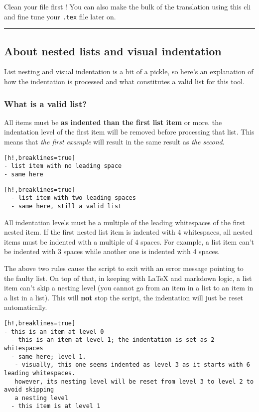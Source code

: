Clean your file first ! You can also make the bulk of the translation using this cli and fine tune your \texttt{.tex} 
file later on.

\par\noindent\rule{\linewidth}{0.4pt}
\subsection{About nested lists and visual indentation}

List nesting and visual indentation is a bit of a pickle, so here's an explanation of how
the indentation is processed and what constitutes a valid list for this tool.
\subsubsection{What is a valid list?}

All items must be \textbf{as indented than the first list item} or more. the indentation level of the first item
will be removed before processing that list. This means that \textit{the first example} will result in the same
result as \textit{the second}.

\begin{Verbatim}[h!,breaklines=true]
- list item with no leading space
- same here
\end{Verbatim}

\begin{Verbatim}[h!,breaklines=true]
  - list item with two leading spaces
  - same here, still a valid list
\end{Verbatim}

All indentation levels must be a multiple of the leading whitespaces of the first nested item. If the first nested 
list item is indented with 4 whitespaces, all nested items must be indented with a multiple of 4 spaces. For example,
a list item can't be indented with 3 spaces while another one is indented with 4 spaces.

The above two rules cause the script to exit with an error message pointing to the faulty list. On top of that,
in keeping with LaTeX and markdown logic, a list item can't skip a nesting level (you cannot go from an item in a list
to an item in a list in a list). This will \textbf{not} stop the script, the indentation will just be reset automatically.

\begin{Verbatim}[h!,breaklines=true]
- this is an item at level 0
  - this is an item at level 1; the indentation is set as 2 whitespaces
  - same here; level 1.
   - visually, this one seems indented as level 3 as it starts with 6 leading whitespaces.
   however, its nesting level will be reset from level 3 to level 2 to avoid skipping
   a nesting level
  - this item is at level 1
\end{Verbatim}
